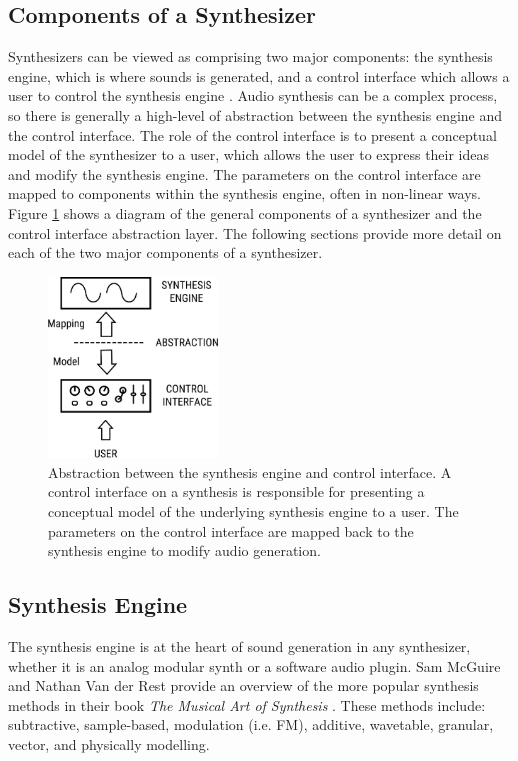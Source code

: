 \subsection{Components of a Synthesizer}
Synthesizers can be viewed as comprising two major components: the synthesis engine, which is where sounds is generated, and a control interface which allows a user to control the synthesis engine \cite{russ2012sound}. Audio synthesis can be a complex process, so there is generally a high-level of abstraction between the synthesis engine and the control interface. The role of the control interface is to present a conceptual model of the synthesizer to a user, which allows the user to express their ideas and modify the synthesis engine. The parameters on the control interface are mapped to components within the synthesis engine, often in non-linear ways. Figure \ref{fig:synth_abstraction} shows a diagram of the general components of a synthesizer and the control interface abstraction layer. The following sections provide more detail on each of the two major components of a synthesizer.

\begin{figure}[ht]
    \centering
    \includegraphics[width=0.4\textwidth]{figures/background/Synth Abstraction Model.pdf}
    \caption{Abstraction between the synthesis engine and control interface. A control interface on a synthesis is responsible for presenting a conceptual model of the underlying synthesis engine to a user. The parameters on the control interface are mapped back to the synthesis engine to modify audio generation.}
    \label{fig:synth_abstraction}
\end{figure}

\subsection{Synthesis Engine}
The synthesis engine is at the heart of sound generation in any synthesizer, whether it is an analog modular synth or a software audio plugin. Sam McGuire and Nathan Van der Rest provide an overview of the more popular synthesis methods in their book \textit{The Musical Art of Synthesis} \cite{mcguire2015musical}. These methods include: subtractive, sample-based, modulation (i.e. FM), additive, wavetable, granular, vector, and physically modelling. 

